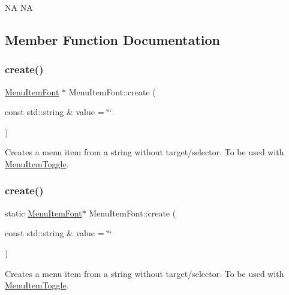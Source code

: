 NA  NA 

\subsection{Member Function Documentation}
\mbox{\label{classMenuItemFont_a0c2ac0d236b3a4118f60a88e0ed5c2bb}} 
\subsubsection{\texorpdfstring{create()}{create()}\hspace{0.1cm}{\footnotesize\ttfamily [1/6]}}
{\footnotesize\ttfamily \hyperlink{classMenuItemFont}{Menu\+Item\+Font} $\ast$ Menu\+Item\+Font\+::create (\begin{DoxyParamCaption}\item[{const std\+::string \&}]{value = {\ttfamily \char`\"{}\char`\"{}} }\end{DoxyParamCaption})\hspace{0.3cm}{\ttfamily [static]}}

Creates a menu item from a string without target/selector. To be used with \hyperlink{classMenuItemToggle}{Menu\+Item\+Toggle}. \mbox{\label{classMenuItemFont_ade8727184f3999b6bd1009add7d84719}} 
\subsubsection{\texorpdfstring{create()}{create()}\hspace{0.1cm}{\footnotesize\ttfamily [2/6]}}
{\footnotesize\ttfamily static \hyperlink{classMenuItemFont}{Menu\+Item\+Font}$\ast$ Menu\+Item\+Font\+::create (\begin{DoxyParamCaption}\item[{const std\+::string \&}]{value = {\ttfamily \char`\"{}\char`\"{}} }\end{DoxyParamCaption})\hspace{0.3cm}{\ttfamily [static]}}

Creates a menu item from a string without target/selector. To be used with \hyperlink{classMenuItemToggle}{Menu\+Item\+Toggle}. \mbox{\label{classMenuItemFont_af84e40c702a3ae82aa5e46674c6bd5eb}} 
